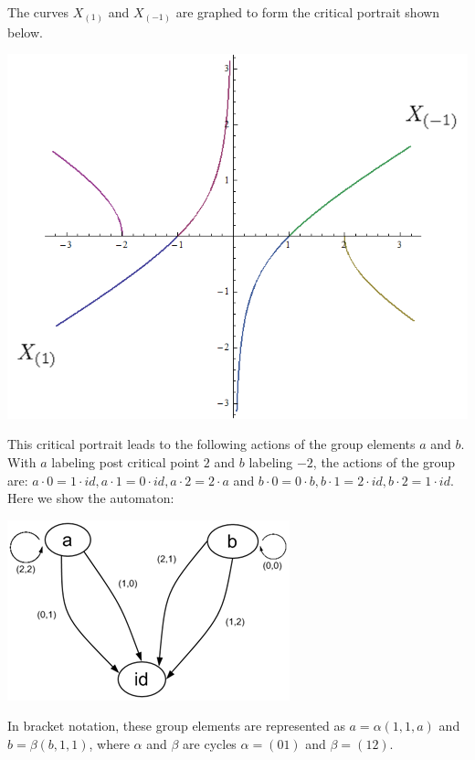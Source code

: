 \documentclass[11pt]{amsart}
\theoremstyle{definition}
\theoremstyle{remark}
\numberwithin{equation}{section}
\begin{document}
The curves $X_{(1)}$ and $X_{(-1)}$ are graphed to form the critical portrait shown below.\\

\begin{center}
\includegraphics[scale=0.5]{minus3critical2.png}
\end{center}

\indent This critical portrait leads to the following actions of the group elements $a$ and $b$.  With $a$ labeling post critical point $2$ and $b$ labeling $-2$, the actions of the group are:
$a \cdot 0 = 1 \cdot id, a \cdot 1 = 0 \cdot id, a \cdot 2 = 2 \cdot a$ and $b \cdot 0 = 0 \cdot b, b \cdot 1 = 2 \cdot id, b \cdot 2 = 1 \cdot id$.  Here we show the automaton:

\begin{center}
\includegraphics{z_3_3z.png}
\end{center} 

\indent In bracket notation, these group elements are represented as $a = \alpha(1, 1, a)$ and $b = \beta(b, 1, 1)$, where $\alpha$ and $\beta$ are cycles $ \alpha = (0 1)$ and $\beta = (1 2)$.  
\end{document}
